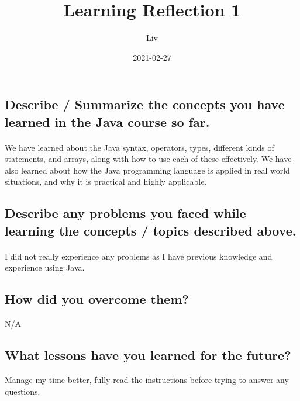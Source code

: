 \documentclass{article}
\title{Learning Reflection 1}
\date{2021-02-27}
\author{Liv}
\begin{document}
    \maketitle

    \subsection*{Describe / Summarize the concepts you have learned in the Java course so far.}
    \paragraph{}
    We have learned about the Java syntax, operators, types, different kinds of statements, and arrays, along with how to use each of these effectively.
    We have also learned about how the Java programming language is applied in real world situations, and why it is practical and highly applicable.
    
    \subsection*{Describe any problems you faced while learning the concepts / topics described above.}
    \paragraph{}
    I did not really experience any problems as I have previous knowledge and experience using Java.

    \subsection*{How did you overcome them?}
    N/A

    \subsection*{What lessons have you learned for the future?}
    Manage my time better, fully read the instructions before trying to answer any questions.
\end{document}
